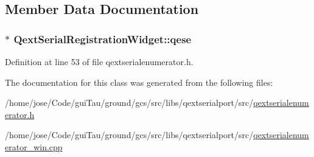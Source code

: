 \subsection{Member Data Documentation}
\hypertarget{class_qext_serial_registration_widget_ac617d06aed20e704e6b1c0b039f999d0}{
\subsubsection[{qese}]{$\ast$ Qext\-Serial\-Registration\-Widget\-::qese\hspace{0.3cm}{\ttfamily [protected]}}}\label{class_qext_serial_registration_widget_ac617d06aed20e704e6b1c0b039f999d0}


Definition at line 53 of file qextserialenumerator.\-h.



The documentation for this class was generated from the following files\-:\begin{DoxyCompactItemize}
\item 
/home/jose/\-Code/gui\-Tau/ground/gcs/src/libs/qextserialport/src/\hyperlink{qextserialenumerator_8h}{qextserialenumerator.\-h}\item 
/home/jose/\-Code/gui\-Tau/ground/gcs/src/libs/qextserialport/src/\hyperlink{qextserialenumerator__win_8cpp}{qextserialenumerator\-\_\-win.\-cpp}\end{DoxyCompactItemize}
